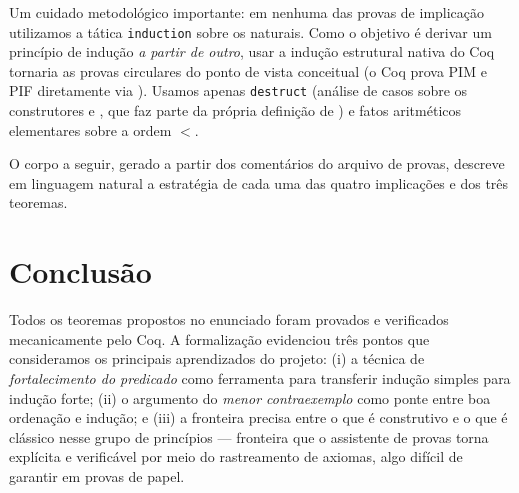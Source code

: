 \documentclass{article}
\begin{document}
Um cuidado metodológico importante: em nenhuma das provas de
implicação utilizamos a tática \texttt{induction} sobre os naturais.
Como o objetivo é derivar um princípio de indução \emph{a partir de
outro}, usar a indução estrutural nativa do Coq tornaria as provas
circulares do ponto de vista conceitual (o Coq prova PIM e PIF
diretamente via ). Usamos apenas
\texttt{destruct} (análise de casos sobre os construtores
 e , que faz parte da própria definição de
) e fatos aritméticos elementares sobre a ordem $<$.

\bigskip

O corpo a seguir, gerado a partir dos comentários do arquivo de
provas, descreve em linguagem natural a estratégia de cada uma das
quatro implicações e dos três teoremas.



\section*{Conclusão}

Todos os teoremas propostos no enunciado foram provados e verificados
mecanicamente pelo Coq. A formalização evidenciou três pontos que
consideramos os principais aprendizados do projeto: (i) a técnica de
\emph{fortalecimento do predicado} como ferramenta para transferir
indução simples para indução forte; (ii) o argumento do \emph{menor
contraexemplo} como ponte entre boa ordenação e indução; e (iii) a
fronteira precisa entre o que é construtivo e o que é clássico nesse
grupo de princípios --- fronteira que o assistente de provas torna
explícita e verificável por meio do rastreamento de axiomas, algo
difícil de garantir em provas de papel.
\end{document}

